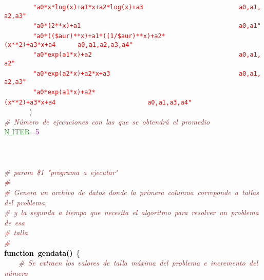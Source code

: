 \mbox{}\ \ \ \ \ \ \ \ \texttt{\textcolor{Red}{"{}a0*x*log(x)+a1*x+a2*log(x)+a3\ \ \ \ \ \ \ \ \ \ \ \ \ \ \ \ \ \ \ \ \ \ \ \ \ \ a0,a1,a2,a3"{}}} \\
\mbox{}\ \ \ \ \ \ \ \ \texttt{\textcolor{Red}{"{}a0*(2**x)+a1\ \ \ \ \ \ \ \ \ \ \ \ \ \ \ \ \ \ \ \ \ \ \ \ \ \ \ \ \ \ \ \ \ \ \ \ \ \ \ \ \ \ \ a0,a1"{}}} \\
\mbox{}\ \ \ \ \ \ \ \ \texttt{\textcolor{Red}{"{}a0*((\$aur)**x)+a1*((1/\$aur)**x)+a2*(x**2)+a3*x+a4\ \ \ \ \ \ a0,a1,a2,a3,a4"{}}} \\
\mbox{}\ \ \ \ \ \ \ \ \texttt{\textcolor{Red}{"{}a0*exp(a1*x)+a2\ \ \ \ \ \ \ \ \ \ \ \ \ \ \ \ \ \ \ \ \ \ \ \ \ \ \ \ \ \ \ \ \ \ \ \ \ \ \ \ a0,a1,a2"{}}} \\
\mbox{}\ \ \ \ \ \ \ \ \texttt{\textcolor{Red}{"{}a0*exp(a2*x)+a2*x+a3\ \ \ \ \ \ \ \ \ \ \ \ \ \ \ \ \ \ \ \ \ \ \ \ \ \ \ \ \ \ \ \ \ \ \ a0,a1,a2,a3"{}}} \\
\mbox{}\ \ \ \ \ \ \ \ \texttt{\textcolor{Red}{"{}a0*exp(a1*x)+a2*(x**2)+a3*x+a4\ \ \ \ \ \ \ \ \ \ \ \ \ \ \ \ \ \ \ \ \ \ \ \ \ a0,a1,a3,a4"{}}}\  \\
\mbox{}\ \ \ \ \ \ \ \textcolor{BrickRed}{)} \\
\mbox{}\textit{\textcolor{Brown}{\#\ Número\ de\ ejecuciones\ con\ las\ que\ se\ obtendrá\ el\ promedio}} \\
\mbox{}\textcolor{ForestGreen}{N$\_$ITER}\textcolor{BrickRed}{=}\textcolor{Purple}{5} \\
\mbox{} \\
\mbox{} \\
\mbox{} \\
\mbox{}\textit{\textcolor{Brown}{\#\ param\ \$1\ "{}programa\ a\ ejecutar"{}}} \\
\mbox{}\textit{\textcolor{Brown}{\#}} \\
\mbox{}\textit{\textcolor{Brown}{\#\ Genera\ un\ archivo\ de\ datos\ donde\ la\ primera\ columna\ correponde\ a\ tallas\ del\ problema,}} \\
\mbox{}\textit{\textcolor{Brown}{\#\ y\ la\ segunda\ a\ tiempo\ que\ necesita\ el\ algoritmo\ para\ resolver\ un\ problema\ de\ esa}} \\
\mbox{}\textit{\textcolor{Brown}{\#\ talla}} \\
\mbox{}\textit{\textcolor{Brown}{\#}} \\
\mbox{}\textbf{\textcolor{Black}{function\ gendata()}}\ \{ \\
\mbox{}\ \ \ \ \textit{\textcolor{Brown}{\#\ Se\ extraen\ los\ valores\ de\ talla\ máxima\ del\ problema\ e\ incremento\ del\ número}} \\
